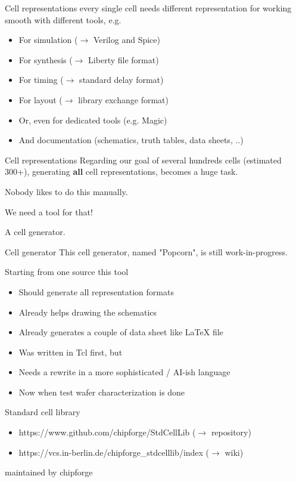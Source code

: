 \documentclass[aspectratio=169]{beamer}
\begin{document}
\begin{frame}{Cell representations}
every single cell needs different representation for working smooth with different tools, e.g.
	\begin{itemize}
		\item For simulation ($\rightarrow$ Verilog and Spice)
		\item For synthesis ($\rightarrow$ Liberty file format)
		\item For timing ($\rightarrow$ standard delay format)
		\item For layout ($\rightarrow$ library exchange format)
		\item Or, even for dedicated tools (e.g. Magic)
		\item And documentation (schematics, truth tables, data sheets, ..)
	\end{itemize}
\end{frame}

\begin{frame}{Cell representations}
Regarding our goal of several hundreds cells (estimated 300+), generating \textbf{all} cell representations, becomes a huge task.

Nobody likes to do this manually.

We need a tool for that!

A cell generator.

\end{frame}

\begin{frame}{Cell generator}
This cell generator, named "Popcorn", is still work-in-progress.

Starting from one source this tool

	\begin{itemize}
		\item Should generate all representation formats
		\item Already helps drawing the schematics
		\item Already generates a couple of data sheet like LaTeX file
		\item Was written in Tcl first, but
		\item Needs a rewrite in a more sophisticated / AI-ish language
		\item Now when test wafer characterization is done
	\end{itemize}
\end{frame}

\begin{frame}{Standard cell library}
	\begin{itemize}
        \setlength\itemsep{1em}
		\item https://www.github.com/chipforge/StdCellLib ($\rightarrow$ repository)
		\item https://vcs.in-berlin.de/chipforge\_stdcelllib/index ($\rightarrow$ wiki)
	\end{itemize}

maintained by chipforge
\end{frame}
\end{document}
